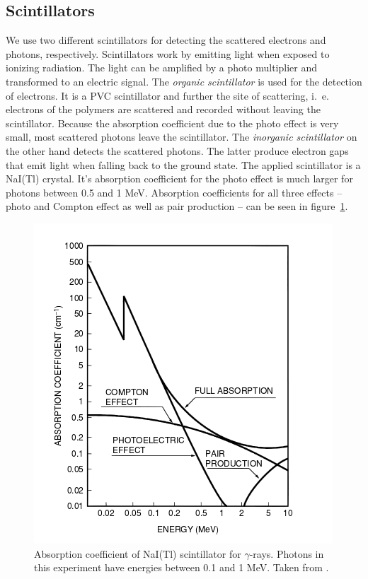 \subsection{Scintillators}
\label{sec:scinti}
We use two different scintillators for detecting the scattered electrons and photons, respectively. Scintillators work by 
emitting light when exposed to ionizing radiation. The light can be amplified by a photo multiplier and transformed to an 
electric signal. 
The \textit{organic scintillator} is used for the detection of electrons. It is a PVC scintillator and further the site of 
scattering, i.~e. electrons of the polymers are scattered and recorded without leaving the scintillator. Because the 
absorption coefficient due to the photo effect is very small, most scattered photons leave the scintillator. 
The \textit{inorganic scintillator} on the other hand detects the scattered photons. The latter produce electron gaps that 
emit light when falling back to the ground state. The applied scintillator is a NaI(Tl) crystal. It's absorption coefficient 
for the photo effect is much larger for photons between 0.5 and 1 MeV. Absorption coefficients for all three effects --
photo and Compton effect as well as pair production -- can be seen in figure~\ref{fig:nai_absorption}. 

\begin{figure}[htpb]
    \centering
    \includegraphics[width=0.5\linewidth]{figures/nai_absorption}
    \caption{
        Absorption coefficient of NaI(Tl) scintillator for $\gamma$-rays. Photons in this experiment have energies 
        between 0.1 and 1 MeV. Taken from \cite{hamamatsu}. 
        }
    \label{fig:nai_absorption}
\end{figure}





